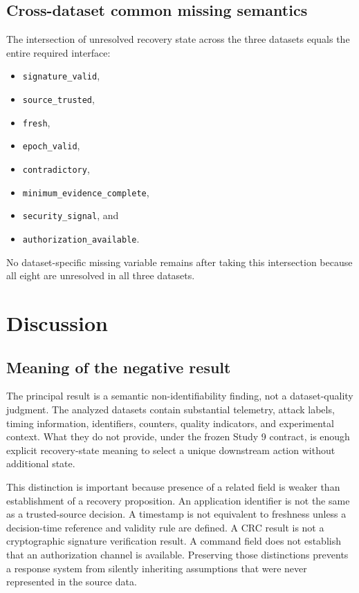 \documentclass[preprint,12pt]{elsarticle}
\begin{document}
\subsection{Cross-dataset common missing semantics}

The intersection of unresolved recovery state across the three datasets equals the entire required interface:
\begin{itemize}[nosep,leftmargin=*]
    \item \texttt{signature\_valid},
    \item \texttt{source\_trusted},
    \item \texttt{fresh},
    \item \texttt{epoch\_valid},
    \item \texttt{contradictory},
    \item \texttt{minimum\_evidence\_complete},
    \item \texttt{security\_signal}, and
    \item \texttt{authorization\_available}.
\end{itemize}
No dataset-specific missing variable remains after taking this intersection because all eight are unresolved in all three datasets.

\section{Discussion}

\subsection{Meaning of the negative result}

The principal result is a semantic non-identifiability finding, not a dataset-quality judgment. The analyzed datasets contain substantial telemetry, attack labels, timing information, identifiers, counters, quality indicators, and experimental context. What they do not provide, under the frozen Study 9 contract, is enough explicit recovery-state meaning to select a unique downstream action without additional state.

This distinction is important because presence of a related field is weaker than establishment of a recovery proposition. An application identifier is not the same as a trusted-source decision. A timestamp is not equivalent to freshness unless a decision-time reference and validity rule are defined. A CRC result is not a cryptographic signature verification result. A command field does not establish that an authorization channel is available. Preserving those distinctions prevents a response system from silently inheriting assumptions that were never represented in the source data.
\end{document}
